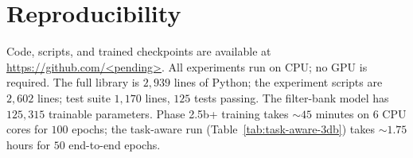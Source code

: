 \documentclass[journal]{IEEEtran}
\begin{document}
\section*{Reproducibility}

Code, scripts, and trained checkpoints are available at
\url{https://github.com/<pending>}. All experiments run on CPU; no GPU is required. The full library is $2{,}939$ lines of Python; the experiment scripts are $2{,}602$ lines; test suite $1{,}170$ lines, $125$ tests passing. The filter-bank model has $125{,}315$ trainable parameters. Phase 2.5b+ training takes $\sim 45$ minutes on 6 CPU cores for $100$ epochs; the task-aware run (Table~\ref{tab:task-aware-3db}) takes $\sim 1.75$ hours for $50$ end-to-end epochs.



\end{document}
